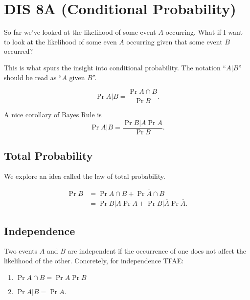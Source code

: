 \section{DIS 8A (Conditional Probability)}

So far we've looked at the likelihood of some event $A$ occurring. What if I want to look at the likelihood of some even $A$ occurring given that some event $B$ occurred? 

This is what spurs the insight into conditional probability. The notation ``$A|B$'' should be read as ``$A$ given $B$''. 

\begin{theorem}
    \[ \Pr{A|B} = \frac{\Pr{A \cap B}}{\Pr{B}}. \]
\end{theorem}

A nice corollary of Bayes Rule is \[ \Pr{A|B} = \frac{\Pr{B|A}\Pr{A}}{\Pr{B}}. \]

\subsection{Total Probability}
We explore an idea called the law of total probability. 

\begin{theorem}
    \begin{align*} \Pr{B} &= \Pr{A \cap B} + \Pr{\overline{A} \cap B} \\
    &= \Pr{B|A}\Pr{A} + \Pr{B|\overline{A}}\Pr{\overline{A}}. 
    \end{align*}
\end{theorem}

\subsection{Independence}
Two events $A$ and $B$ are independent if the occurrence of one does not affect the likelihood of the other. Concretely, for independence TFAE: 
\begin{enumerate}
    \item $\Pr{A \cap B} = \Pr{A}\Pr{B}$
    \item $\Pr{A|B} = \Pr{A}$. 
\end{enumerate}